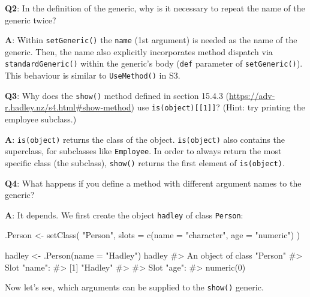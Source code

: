 \documentclass[
]{krantz}
\makeatletter
\newenvironment{Shaded}{\begin{snugshade}}{\end{snugshade}}
\newcommand{\CommentTok}[1]{\textcolor[rgb]{0.56,0.35,0.01}{\textit{#1}}}
\newcommand{\DataTypeTok}[1]{\textcolor[rgb]{0.13,0.29,0.53}{#1}}
\newcommand{\KeywordTok}[1]{\textcolor[rgb]{0.13,0.29,0.53}{\textbf{#1}}}
\newcommand{\NormalTok}[1]{#1}
\newcommand{\StringTok}[1]{\textcolor[rgb]{0.31,0.60,0.02}{#1}}
\renewcommand{\href}[2]{#2 (\url{#1})}
\newenvironment{kframe}{%
\medskip{}
\setlength{\fboxsep}{.8em}
 \def\at@end@of@kframe{}%
 \ifinner\ifhmode%
  \def\at@end@of@kframe{\end{minipage}}%
  \begin{minipage}{\columnwidth}%
 \fi\fi%
 \def\FrameCommand##1{\hskip\@totalleftmargin \hskip-\fboxsep
 \colorbox{shadecolor}{##1}\hskip-\fboxsep
     \hskip-\linewidth \hskip-\@totalleftmargin \hskip\columnwidth}%
 \MakeFramed {\advance\hsize-\width
   \@totalleftmargin\z@ \linewidth\hsize
   \@setminipage}}%
 {\par\unskip\endMakeFramed%
 \at@end@of@kframe}
\renewenvironment{Shaded}{\begin{kframe}}{\end{kframe}}
\renewcommand{\KeywordTok} [1]{\textcolor[rgb]{0.00,0.44,0.13}{{#1}}}
\renewcommand{\DataTypeTok}[1]{\textcolor[rgb]{0.56,0.13,0.00}{{#1}}}
\renewcommand{\StringTok}  [1]{\textcolor[rgb]{0.25,0.44,0.63}{{#1}}}
\renewcommand{\CommentTok} [1]{\textcolor[rgb]{0.38,0.63,0.69}{{#1}}}
\renewcommand{\NormalTok}  [1]{{#1}}
\makeatother
\begin{document}
\textbf{{Q2}}: In the definition of the generic, why is it necessary to repeat the name of the generic twice?

\textbf{{A}}: Within \texttt{setGeneric()} the \texttt{name} (1st argument) is needed as the name of the generic. Then, the name also explicitly incorporates method dispatch via \texttt{standardGeneric()} within the generic's body (\texttt{def} parameter of \texttt{setGeneric()}). This behaviour is similar to \texttt{UseMethod()} in S3.

\textbf{{Q3}}: Why does the \texttt{show()} method defined in section \href{https://adv-r.hadley.nz/s4.html\#show-method}{15.4.3} use \texttt{is(object){[}{[}1{]}{]}}? (Hint: try printing the employee subclass.)

\textbf{{A}}: \texttt{is(object)} returns the class of the object. \texttt{is(object)} also contains the superclass, for subclasses like \texttt{Employee}. In order to always return the most specific class (the subclass), \texttt{show()} returns the first element of \texttt{is(object)}.

\textbf{{Q4}}: What happens if you define a method with different argument names to the generic?

\textbf{{A}}: It depends. We first create the object \texttt{hadley} of class \texttt{Person}:

\begin{Shaded}
\begin{Highlighting}[]
\NormalTok{.Person <-}\StringTok{ }\KeywordTok{setClass}\NormalTok{(}
  \StringTok{"Person"}\NormalTok{,}
  \DataTypeTok{slots =} \KeywordTok{c}\NormalTok{(}\DataTypeTok{name =} \StringTok{"character"}\NormalTok{, }\DataTypeTok{age =} \StringTok{"numeric"}\NormalTok{)}
\NormalTok{)}

\NormalTok{hadley <-}\StringTok{ }\KeywordTok{.Person}\NormalTok{(}\DataTypeTok{name =} \StringTok{"Hadley"}\NormalTok{)}
\NormalTok{hadley}
\CommentTok{#> An object of class "Person"}
\CommentTok{#> Slot "name":}
\CommentTok{#> [1] "Hadley"}
\CommentTok{#> }
\CommentTok{#> Slot "age":}
\CommentTok{#> numeric(0)}
\end{Highlighting}
\end{Shaded}

Now let's see, which arguments can be supplied to the \texttt{show()} generic.

\begin{Shaded}
\end{Shaded}
\end{document}
